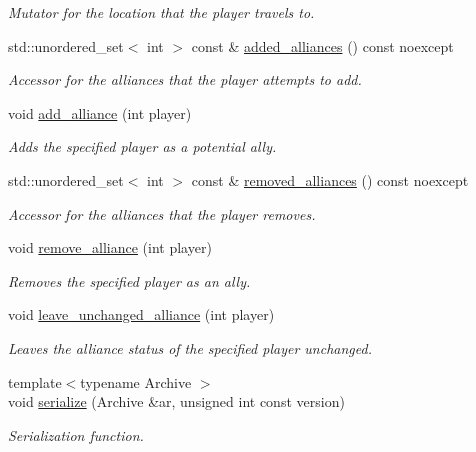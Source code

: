 \begin{DoxyCompactItemize}
\begin{DoxyCompactList}\small\item\em Mutator for the location that the player travels to. \end{DoxyCompactList}\item 
std\+::unordered\+\_\+set$<$ int $>$ const  \& \hyperlink{classexternal_1_1_move_data_a0bcb09d49ed392fb21395d6182d63f26}{added\+\_\+alliances} () const noexcept
\begin{DoxyCompactList}\small\item\em Accessor for the alliances that the player attempts to add. \end{DoxyCompactList}\item 
void \hyperlink{classexternal_1_1_move_data_ae3a11d3c816e165ac2ceff604f191d32}{add\+\_\+alliance} (int player)
\begin{DoxyCompactList}\small\item\em Adds the specified player as a potential ally. \end{DoxyCompactList}\item 
std\+::unordered\+\_\+set$<$ int $>$ const  \& \hyperlink{classexternal_1_1_move_data_ace46398597a4ba0139c7c043d0d8d5be}{removed\+\_\+alliances} () const noexcept
\begin{DoxyCompactList}\small\item\em Accessor for the alliances that the player removes. \end{DoxyCompactList}\item 
void \hyperlink{classexternal_1_1_move_data_a397656419a2c5adf79ee8bf1bfae9ca8}{remove\+\_\+alliance} (int player)
\begin{DoxyCompactList}\small\item\em Removes the specified player as an ally. \end{DoxyCompactList}\item 
void \hyperlink{classexternal_1_1_move_data_a15f54d7e6fbf21cc9634e6f2bb854317}{leave\+\_\+unchanged\+\_\+alliance} (int player)
\begin{DoxyCompactList}\small\item\em Leaves the alliance status of the specified player unchanged. \end{DoxyCompactList}\item 
{\footnotesize template$<$typename Archive $>$ }\\void \hyperlink{classexternal_1_1_move_data_afd1bb4302c0f725033149887c232af1a}{serialize} (Archive \&ar, unsigned int const version)
\begin{DoxyCompactList}\small\item\em Serialization function. \end{DoxyCompactList}\end{DoxyCompactItemize}


